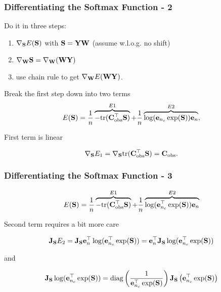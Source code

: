 \documentclass[12pt,fleqn,handout]{beamer}
\begin{document}
\begin{frame}[fragile]\frametitle{Differentiating the Softmax Function - 2}

Do it in three steps:
\begin{enumerate}
	\item $\nabla_{{\bf S}} E({\bf S})$ with ${\bf S} = {\bf Y} {\bf W}$ (assume w.l.o.g. no shift)
	\item $\nabla_{{\bf W}} {\bf S} = \nabla_{{\bf W}} ({\bf W} {\bf Y})$
	\item use chain rule to get $\nabla_{{\bf W}} E({\bf W}{\bf Y})$.
\end{enumerate}

\bigskip
\pause

Break the first step down into two terms
$$ E({\bf S}) = \frac{1}{n} \overbrace{-{\rm tr}({\bf C}_{\rm obs}^{\top} {\bf S})}^{E1} + \frac{1}{n} \overbrace{\log({\bf e}_{n_c}\exp({\bf S})){\bf e}_n}^{E2}, $$


\bigskip
\pause

First term is linear

$$\nabla_{{\bf S}}E_1 =  \nabla_{{\bf S}} {\rm tr}({\bf C}_{\rm obs}^{\top} {\bf S}) = {\bf C}_{\rm obs}. $$

\end{frame}

\begin{frame}[fragile]\frametitle{Differentiating the Softmax Function - 3}


$$ E({\bf S}) = \frac{1}{n}\overbrace{-{\rm tr}({\bf C}_{\rm obs}^{\top} {\bf S})}^{E1} + \frac{1}{n} \overbrace{\log({\bf e}_{n_c}^\top\exp({\bf S})){\bf e}_n}^{E2}  $$


\bigskip

Second  term requires a bit more care

$$ {\bf J}_{{\bf S}}E_2 = {\bf J}_{{\bf S}} {\bf e}_n^{\top}\log({\bf e}_{n_c}^\top \exp({\bf S})) = 
 {\bf e}_n^{\top}{\bf J}_{{\bf S}}  \log({\bf e}_{n_c}^\top\exp({\bf S}))  $$

\pause 
 and
 
$$ {\bf J}_{{\bf S}}  \log({\bf e}_{n_c}^\top\exp({\bf S})) = {\rm diag}
\left( {\frac {1}{{\bf e}_{n_c}^\top\exp({\bf S})}}\right)
{\bf J}_{{\bf S}}\left({\bf e}_{n_c}^\top\exp({\bf S}) \right) $$
 

\end{frame}
\end{document}
